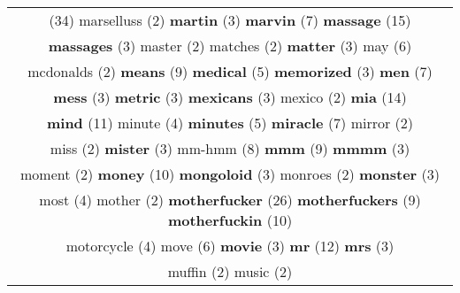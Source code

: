 \documentclass[12pt,a4paper]{article}
\begin{document}
\begin{center}
\begin{longtable}{|c|}
\footnotesize{(34)} {\footnotesize \textcolor{Verde} {marselluss}} \footnotesize{(2)} {\small \textcolor{Laranja} {\bf martin}} \footnotesize{(3)} {\LARGE \textcolor{Rosa} {\bf marvin}} \footnotesize{(7)} {\Huge \textcolor{AzulEscuro} {\bf massage}} \footnotesize{(15)}  \\ {\small \textcolor{Laranja} {\bf massages}} \footnotesize{(3)} {\footnotesize \textcolor{Verde} {master}} \footnotesize{(2)} {\footnotesize \textcolor{Verde} {matches}} \footnotesize{(2)} {\small \textcolor{Laranja} {\bf matter}} \footnotesize{(3)} {\Large \textcolor{VermEscuro} {may}} \footnotesize{(6)}  \\ {\footnotesize \textcolor{Verde} {mcdonalds}} \footnotesize{(2)} {\Huge \textcolor{AzulEscuro} {\bf means}} \footnotesize{(9)} {\large \textcolor{Roxo} {\bf medical}} \footnotesize{(5)} {\small \textcolor{Laranja} {\bf memorized}} \footnotesize{(3)} {\LARGE \textcolor{Rosa} {\bf men}} \footnotesize{(7)}  \\ {\small \textcolor{Laranja} {\bf mess}} \footnotesize{(3)} {\small \textcolor{Laranja} {\bf metric}} \footnotesize{(3)} {\small \textcolor{Laranja} {\bf mexicans}} \footnotesize{(3)} {\footnotesize \textcolor{Verde} {mexico}} \footnotesize{(2)} {\Huge \textcolor{AzulEscuro} {\bf mia}} \footnotesize{(14)}  \\ {\Huge \textcolor{AzulEscuro} {\bf mind}} \footnotesize{(11)} {\normalsize \textcolor{VerdeLocao} {minute}} \footnotesize{(4)} {\large \textcolor{Roxo} {\bf minutes}} \footnotesize{(5)} {\LARGE \textcolor{Rosa} {\bf miracle}} \footnotesize{(7)} {\footnotesize \textcolor{Verde} {mirror}} \footnotesize{(2)}  \\ {\footnotesize \textcolor{Verde} {miss}} \footnotesize{(2)} {\small \textcolor{Laranja} {\bf mister}} \footnotesize{(3)} {\huge \textcolor{Amarelo} {mm-hmm}} \footnotesize{(8)} {\Huge \textcolor{AzulEscuro} {\bf mmm}} \footnotesize{(9)} {\small \textcolor{Laranja} {\bf mmmm}} \footnotesize{(3)}  \\ {\footnotesize \textcolor{Verde} {moment}} \footnotesize{(2)} {\Huge \textcolor{AzulEscuro} {\bf money}} \footnotesize{(10)} {\small \textcolor{Laranja} {\bf mongoloid}} \footnotesize{(3)} {\footnotesize \textcolor{Verde} {monroes}} \footnotesize{(2)} {\small \textcolor{Laranja} {\bf monster}} \footnotesize{(3)}  \\ {\normalsize \textcolor{VerdeLocao} {most}} \footnotesize{(4)} {\footnotesize \textcolor{Verde} {mother}} \footnotesize{(2)} {\Huge \textcolor{AzulEscuro} {\bf motherfucker}} \footnotesize{(26)} {\Huge \textcolor{AzulEscuro} {\bf motherfuckers}} \footnotesize{(9)} {\Huge \textcolor{AzulEscuro} {\bf motherfuckin}} \footnotesize{(10)}  \\ {\normalsize \textcolor{VerdeLocao} {motorcycle}} \footnotesize{(4)} {\Large \textcolor{VermEscuro} {move}} \footnotesize{(6)} {\small \textcolor{Laranja} {\bf movie}} \footnotesize{(3)} {\Huge \textcolor{AzulEscuro} {\bf mr}} \footnotesize{(12)} {\small \textcolor{Laranja} {\bf mrs}} \footnotesize{(3)}  \\ {\footnotesize \textcolor{Verde} {muffin}} \footnotesize{(2)} {\footnotesize \textcolor{Verde} {music}} \footnotesize{(2)} {\Huge \textcolor{AzulEscuro} 
\end{longtable}
\end{center}
\end{document}
